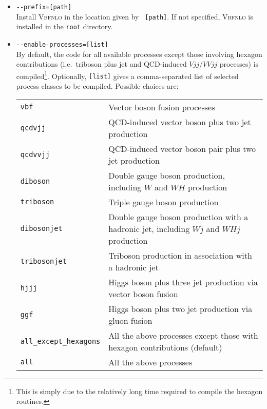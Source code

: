 \documentclass[english,12pt]{article}
\begin{document}
\begin{itemize}
\item {\tt -{}-prefix=[path]} \\ Install \textsc{Vbfnlo} in the location given by {\tt
[path]}.  If not specified, \textsc{Vbfnlo} is installed in the {\tt root} directory.
\item {\tt -{}-enable-processes=[list]} \\ By default, the code for all
available processes except those involving hexagon contributions (i.e.\ triboson
plus jet and QCD-induced $Vjj$/$VVjj$ processes) is compiled\footnote{This is simply due to the relatively
long time required to compile the hexagon routines.}. Optionally, {\tt [list]}
gives a comma-separated list of selected process classes to be compiled. Possible
choices are:

\begin{tabular}{lp{}}
{\tt vbf} & Vector boson fusion processes \\ 
{\tt qcdvjj} & QCD-induced vector boson plus two jet production \\
{\tt qcdvvjj} & QCD-induced vector boson pair plus two jet production \\
{\tt diboson} & Double gauge boson production, including $W$ and $WH$ production \\ 
{\tt triboson} & Triple gauge boson production \\ 
{\tt dibosonjet} & Double gauge boson production with a hadronic jet, including $Wj$ and $WHj$ production \\ 
{\tt tribosonjet} & Triboson production in association with a hadronic jet \\ 
{\tt hjjj} & Higgs boson plus three jet production via vector boson fusion \\ 
{\tt ggf} & Higgs boson plus two jet production via gluon fusion \\
{\tt all\_except\_hexagons} & All the above processes except those with
                              hexagon contributions (default) \\
{\tt all} & All the above processes
\end{tabular}


\end{itemize}
\end{document}
